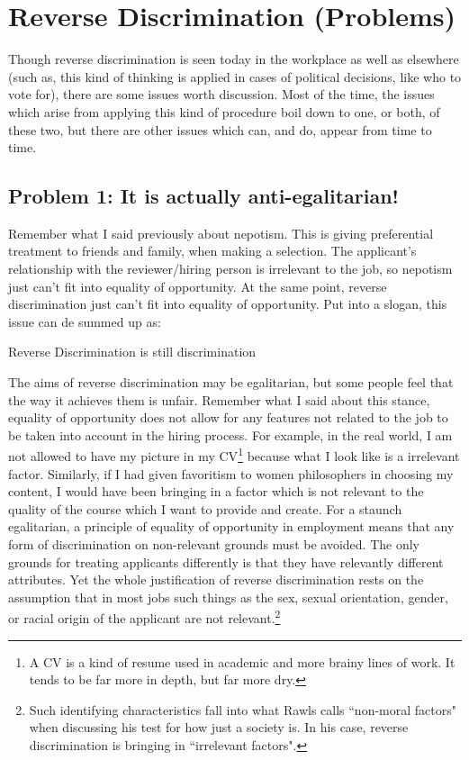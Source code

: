 \section{Reverse Discrimination (Problems)}

Though reverse discrimination is seen today in the workplace as well as elsewhere (such as, this kind of thinking is applied in cases of political decisions, like who to vote for), there are some issues worth discussion. Most of the time, the issues which arise from applying this kind of procedure boil down to one, or both, of these two, but there are other issues which can, and do, appear from time to time.
\subsection{Problem 1: It is actually anti-egalitarian!}

Remember what I said previously about nepotism. This is giving preferential treatment to friends and family, when making a selection. The applicant's relationship with the reviewer/hiring person is irrelevant to the job, so nepotism just can't fit into equality of opportunity. At the same point, reverse discrimination just can't fit into equality of opportunity. Put into a slogan, this issue can de summed up as:
\begin{center}
Reverse Discrimination is still discrimination
\end{center}
The aims of reverse discrimination may be egalitarian, but some people feel that the way it achieves them is unfair. Remember what I said about this stance, equality of opportunity does not allow for any features not related to the job to be taken into account in the hiring process. For example, in the real world, I am not allowed to have my picture in my CV\footnote{A CV is a kind of resume used in academic and more brainy lines of work. It tends to be far more in depth, but far more dry.} because what I look like is a irrelevant factor. Similarly, if I had given favoritism to women philosophers in choosing my content, I would have been bringing in a factor which is not relevant to the quality of the course which I want to provide and create. For a staunch egalitarian, a principle of equality of opportunity in employment means that any form of discrimination on non-relevant grounds must be avoided. The only grounds for treating applicants differently is that they have relevantly different attributes. Yet the whole justification of reverse discrimination rests on the assumption that in most jobs such things as the sex, sexual orientation, gender, or racial origin of the applicant are not relevant.\footnote{Such identifying characteristics fall into what Rawls calls ``non-moral factors" when discussing his test for how just a society is. In his case, reverse discrimination is bringing in ``irrelevant factors".}

